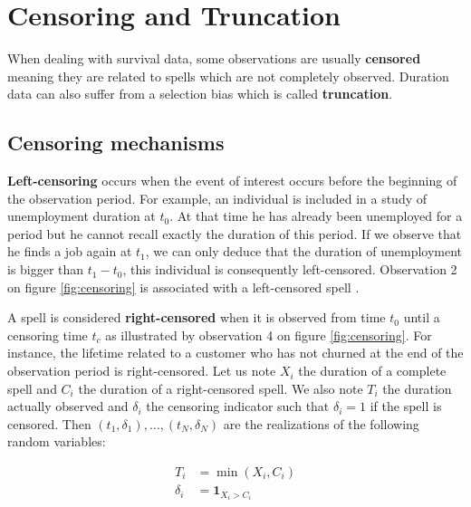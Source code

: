 \documentclass[
]{book}
\begin{document}
\hypertarget{censoring-and-truncation}{%
\section{Censoring and Truncation}\label{censoring-and-truncation}}

When dealing with survival data, some observations are usually \textbf{censored} meaning they are related to spells which are not completely observed. Duration data can also suffer from a selection bias which is called \textbf{truncation}.

\hypertarget{censoring-mechanisms}{%
\subsection{Censoring mechanisms}\label{censoring-mechanisms}}

\textbf{Left-censoring} occurs when the event of interest occurs before the beginning of the observation period. For example, an individual is included in a study of unemployment duration at \(t_0\). At that time he has already been unemployed for a period but he cannot recall exactly the duration of this period. If we observe that he finds a job again at \(t_1\), we can only deduce that the duration of unemployment is bigger than \(t_1-t_0\), this individual is consequently left-censored. Observation 2 on figure \ref{fig:censoring} is associated with a left-censored spell \citep{LIU_SCOR}.

A spell is considered \textbf{right-censored} when it is observed from time \(t_0\) until a censoring time \(t_c\) as illustrated by observation 4 on figure \ref{fig:censoring}. For instance, the lifetime related to a customer who has not churned at the end of the observation period is right-censored. Let us note \(X_i\) the duration of a complete spell and \(C_i\) the duration of a right-censored spell. We also note \(T_i\) the duration actually observed and \(\delta_i\) the censoring indicator such that \(\delta_i = 1\) if the spell is censored. Then \((t_1, \delta_1),\dots,(t_N, \delta_N)\) are the realizations of the following random variables:

\begin{equation}
  \begin{aligned}
  T_i & = \min(X_i, C_i) \\
  \delta_i & = \pmb{1}_{X_i > C_i}
  \end{aligned}
  \label{eq:censoring}
\end{equation}
\end{document}
